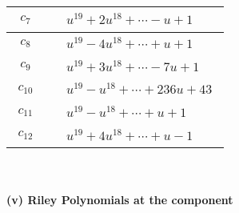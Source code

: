 \documentclass[1p]{elsarticle_modified}
\theoremstyle{definition}
\begin{document}
\begin{tabular}{m{50pt}|m{274pt}}
\hline $$\begin{aligned}c_{7}\end{aligned}$$&$\begin{aligned}
&u^{19}+2 u^{18}+\cdots- u+1
\end{aligned}$\\
\hline $$\begin{aligned}c_{8}\end{aligned}$$&$\begin{aligned}
&u^{19}-4 u^{18}+\cdots+u+1
\end{aligned}$\\
\hline $$\begin{aligned}c_{9}\end{aligned}$$&$\begin{aligned}
&u^{19}+3 u^{18}+\cdots-7 u+1
\end{aligned}$\\
\hline $$\begin{aligned}c_{10}\end{aligned}$$&$\begin{aligned}
&u^{19}- u^{18}+\cdots+236 u+43
\end{aligned}$\\
\hline $$\begin{aligned}c_{11}\end{aligned}$$&$\begin{aligned}
&u^{19}- u^{18}+\cdots+u+1
\end{aligned}$\\
\hline $$\begin{aligned}c_{12}\end{aligned}$$&$\begin{aligned}
&u^{19}+4 u^{18}+\cdots+u-1
\end{aligned}$\\
\hline
\end{tabular}\\~\\
\newpage\renewcommand{\arraystretch}{1}
\flushleft \textbf{(v) Riley Polynomials at the component}\newline \\
\end{document}
